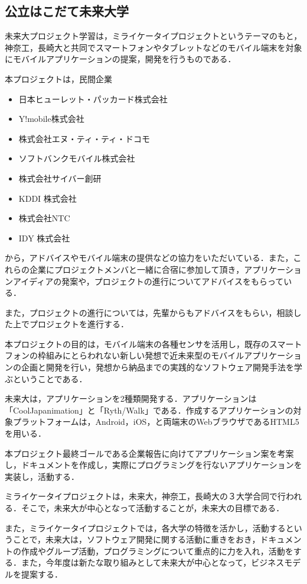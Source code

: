 \subsection{公立はこだて未来大学}
\par
未来大プロジェクト学習は，ミライケータイプロジェクトというテーマのもと，神奈工，長崎大と共同でスマートフォンやタブレットなどのモバイル端末を対象にモバイルアプリケーションの提案，開発を行うものである．
\par
本プロジェクトは，民間企業
\begin{itemize}
\item 日本ヒューレット・パッカード株式会社
\item Y!mobile株式会社
\item 株式会社エヌ・ティ・ティ・ドコモ
\item ソフトバンクモバイル株式会社
\item 株式会社サイバー創研
\item KDDI 株式会社
\item 株式会社NTC
\item IDY 株式会社
\end{itemize}
から，アドバイスやモバイル端末の提供などの協力をいただいている．また，これらの企業にプロジェクトメンバと一緒に合宿に参加して頂き，アプリケーションアイディアの発案や，プロジェクトの進行についてアドバイスをもらっている．
\par
また，プロジェクトの進行については，先輩からもアドバイスをもらい，相談した上でプロジェクトを進行する．
\par
本プロジェクトの目的は，モバイル端末の各種センサを活用し，既存のスマートフォンの枠組みにとらわれない新しい発想で近未来型のモバイルアプリケーションの企画と開発を行い，発想から納品までの実践的なソフトウェア開発手法を学ぶということである．
\par
未来大は，アプリケーションを2種類開発する．アプリケーションは「CoolJapanimation」と「Ryth/Walk」である．作成するアプリケーションの対象プラットフォームは，Android，iOS，と両端末のWebブラウザであるHTML5を用いる．
\par
本プロジェクト最終ゴールである企業報告に向けてアプリケーション案を考案し，ドキュメントを作成し，実際にプログラミングを行ないアプリケーションを実装し，活動する．
\par
ミライケータイプロジェクトは，未来大，神奈工，長崎大の３大学合同で行われる．そこで，未来大が中心となって活動することが，未来大の目標である．
\par
また，ミライケータイプロジェクトでは，各大学の特徴を活かし，活動するということで，未来大は，ソフトウェア開発に関する活動に重きをおき，ドキュメントの作成やグループ活動，プログラミングについて重点的に力を入れ，活動をする．また，今年度は新たな取り組みとして未来大が中心となって，ビジネスモデルを提案する．
